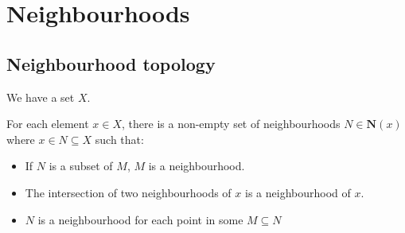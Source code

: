 
\section{Neighbourhoods}

\subsection{Neighbourhood topology}

We have a set \(X\).

For each element \(x\in X\), there is a non-empty set of neighbourhoods \(N\in \mathbf N(x)\) where \(x\in N\subseteq X\) such that:

\begin{itemize}
\item If \(N\) is a subset of \(M\), \(M\) is a neighbourhood.
\item The intersection of two neighbourhoods of \(x\) is a neighbourhood of \(x\).
\item \(N\) is a neighbourhood for each point in some \(M\subseteq N\)
\end{itemize}



